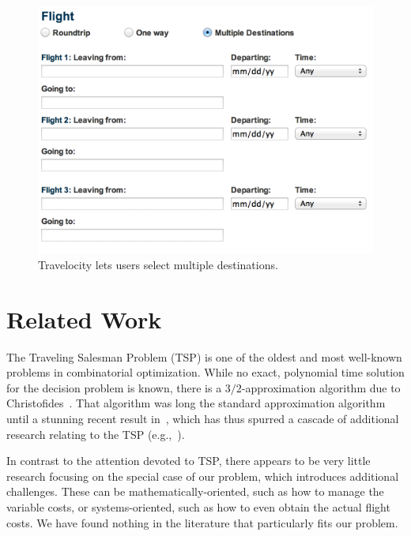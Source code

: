 \documentclass{article}
\begin{document}
\begin{figure}[t]
\vskip 0.2in
\begin{center}
\centerline{\includegraphics[width=\columnwidth]{travelocity}}
\caption{Travelocity lets users select multiple destinations.}
\label{fig:travelocity}
\end{center}
\vskip -0.2in
\end{figure}

\section{Related Work}\label{sec:related_work}

The Traveling Salesman Problem (TSP) is one of the oldest and most well-known problems in combinatorial optimization. While no exact, polynomial time
solution for the decision problem is known, there is a $3/2$-approximation algorithm due to Christofides~\cite{Chr76}. That algorithm was long the
standard approximation algorithm until a stunning recent result in~\cite{conf/focs/GharanSS11}, which has thus spurred a cascade of additional
research relating to the TSP (e.g.,~\cite{Moemke:2011:AGT:2082752.2082898}).

In contrast to the attention devoted to TSP, there appears to be very little research focusing on the special case of our problem, which introduces
additional challenges. These can be mathematically-oriented, such as how to manage the variable costs, or systems-oriented, such as how to even obtain
the actual flight costs. We have found nothing in the literature that particularly fits our problem.
\end{document}

